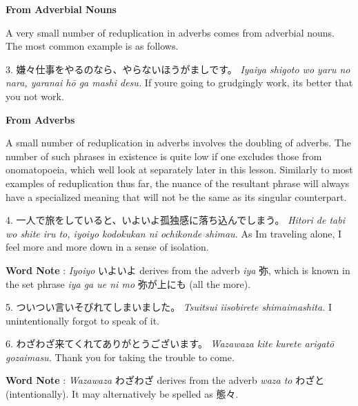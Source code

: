 \begin{center}
\textbf{From Adverbial Nouns }
\end{center}

\par{ A very small number of reduplication in adverbs comes from adverbial nouns. The most common example is as follows. }

\par{3. 嫌々仕事をやるのなら、やらないほうがましです。 \hfill\break
 \emph{Iyaiya shigoto wo yaru no nara, yaranai hō ga mashi desu. } \hfill\break
If you\textquotesingle re going to grudgingly work, it\textquotesingle s better that you not work. }

\begin{center}
\textbf{From Adverbs }
\end{center}

\par{ A small number of reduplication in adverbs involves the doubling of adverbs. The number of such phrases in existence is quite low if one excludes those from onomatopoeia, which we\textquotesingle ll look at separately later in this lesson. Similarly to most examples of reduplication thus far, the nuance of the resultant phrase will always have a specialized meaning that will not be the same as its singular counterpart. }

\par{4. 一人で旅をしていると、いよいよ孤独感に落ち込んでしまう。 \hfill\break
 \emph{Hitori de tabi wo shite iru to, iyoiyo kodokukan ni ochikonde shimau. \hfill\break
 }As I\textquotesingle m traveling alone, I feel more and more down in a sense of isolation. }

\par{\textbf{Word Note }: \emph{Iyoiyo }いよいよ derives from the adverb \emph{iya }弥, which is known in the set phrase \emph{iya ga ue ni mo }弥が上にも (all the more). }

\par{5. ついつい言いそびれてしまいました。 \hfill\break
 \emph{Tsuitsui iisobirete shimaimashita. \hfill\break
 }I unintentionally forgot to speak of it. }

\par{6. わざわざ来てくれてありがとうございます。 \hfill\break
 \emph{Wazawaza kite kurete arigatō gozaimasu. }\hfill\break
Thank you for taking the trouble to come. }

\par{\textbf{Word Note }: \emph{Wazawaza }わざわざ derives from the adverb \emph{waza to }わざと (intentionally). It may alternatively be spelled as 態々. }

